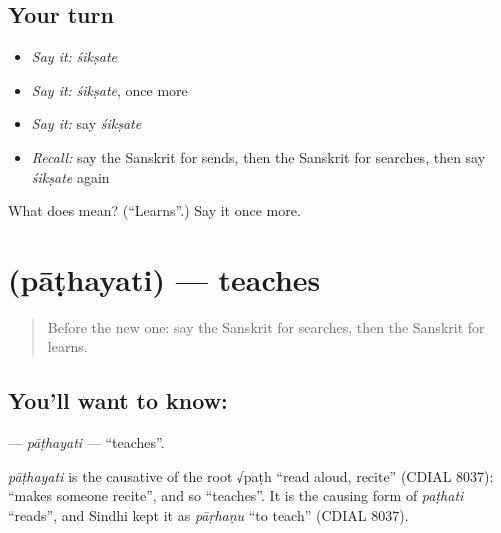 \subsection*{Your turn}
\begin{itemize}
\raggedright
  \item \emph{Say it:} \emph{śikṣate}
  \item \emph{Say it:} \emph{śikṣate}, once more
  \item \emph{Say it:} say \emph{śikṣate}
  \item \emph{Recall:} say the Sanskrit for sends, then the Sanskrit for searches, then say \emph{śikṣate} again
\end{itemize}

\begin{tcolorbox}[breakable,colback=teal!4,colframe=teal!35!black,title={Before you move on}]
What does  mean? (\textquotedblleft{}Learns\textquotedblright{}.) Say it once more.
\end{tcolorbox}
\section[\texorpdfstring{\sk{पाठयति} (pāṭhayati)}{पाठयति (pāṭhayati)}]{ (pāṭhayati) — teaches}

\label{lesson:SA-C135-pathayati}



\begin{quote}
Before the new one: say the Sanskrit for searches, then the Sanskrit for learns.
\end{quote}

\subsection*{You'll want to know: }
\textbf{} — \emph{pāṭhayati} — \textquotedblleft{}teaches\textquotedblright{}.

\begin{cousinweb}
\emph{pāṭhayati} is the causative of the root √paṭh \textquotedblleft{}read aloud, recite\textquotedblright{} (CDIAL 8037): \textquotedblleft{}makes someone recite\textquotedblright{}, and so \textquotedblleft{}teaches\textquotedblright{}. It is the causing form of \emph{paṭhati} \textquotedblleft{}reads\textquotedblright{}, and Sindhi kept it as \emph{pāṛhaṇu} \textquotedblleft{}to teach\textquotedblright{} (CDIAL 8037).
\end{cousinweb}

